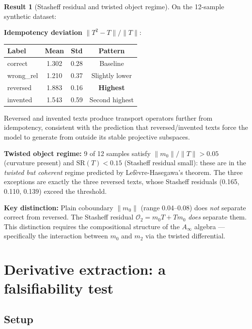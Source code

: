 \documentclass[11pt]{amsart}
\theoremstyle{definition}
\newtheorem{result}[theorem]{Result}
\begin{document}
\begin{result}[Stasheff residual and twisted object regime]
\label{result:stasheff}
On the 12-sample synthetic dataset:

\noindent\textbf{Idempotency deviation} $\|T^2-T\|/\|T\|$:
\begin{center}
\begin{tabular}{@{}lccc@{}}
\toprule
Label & Mean & Std & Pattern \\
\midrule
correct   & 1.302 & 0.28 & Baseline \\
wrong\_rel & 1.210 & 0.37 & Slightly lower \\
reversed  & 1.883 & 0.16 & \textbf{Highest} \\
invented  & 1.543 & 0.59 & Second highest \\
\bottomrule
\end{tabular}
\end{center}

Reversed and invented texts produce transport operators further from idempotency,
consistent with the prediction that reversed/invented texts force the model to
generate from outside its stable projective subspaces.

\noindent\textbf{Twisted object regime:}
9 of 12 samples satisfy $\|m_0\|/\|T\| > 0.05$ (curvature present) and
$\mathrm{SR}(T) < 0.15$ (Stasheff residual small): these are in the
\emph{twisted but coherent} regime predicted by Lef\`evre-Hasegawa's theorem.
The three exceptions are exactly the three reversed texts,
whose Stasheff residuals (0.165, 0.110, 0.139) exceed the threshold.

\noindent\textbf{Key distinction:}
Plain coboundary $\|m_0\|$ (range 0.04--0.08) does \emph{not} separate correct from reversed.
The Stasheff residual $\mathcal{O}_2 = m_0 T + Tm_0$ \emph{does} separate them.
This distinction requires the compositional structure of the $A_\infty$ algebra ---
specifically the interaction between $m_0$ and $m_2$ via the twisted differential.
\end{result}

\section{Derivative extraction: a falsifiability test}
\label{sec:derivative}

\subsection{Setup}
\end{document}
